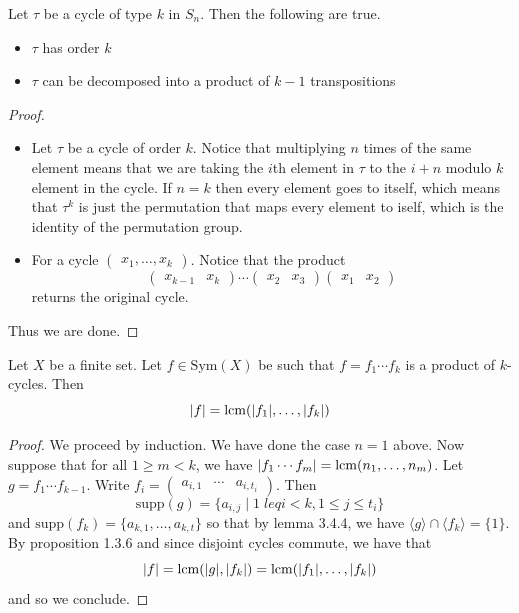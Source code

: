 \documentclass[a4paper]{article}
\begin{document}
\begin{prp}{}{} Let $\tau$ be a cycle of type $k$ in $S_n$. Then the following are true. 
\begin{itemize}
\item $\tau$ has order $k$
\item $\tau$ can be decomposed into a product of $k-1$ transpositions
\end{itemize}
\begin{proof}~\\
\begin{itemize}
\item Let $\tau$ be a cycle of order $k$. Notice that multiplying $n$ times of the same element means that we are taking the $i$th element in $\tau$ to the $i+n$ modulo $k$ element in the cycle. If $n=k$ then every element goes to itself, which means that $\tau^k$ is just the permutation that maps every element to iself, which is the identity of the permutation group. 
\item For a cycle $\begin{pmatrix}x_1,\dots,x_k\end{pmatrix}$. Notice that the product $$\begin{pmatrix}x_{k-1}&x_k\end{pmatrix}\cdots\begin{pmatrix}x_2&x_3\end{pmatrix}\begin{pmatrix}x_1&x_2\end{pmatrix}$$ returns the original cycle. 
\end{itemize}
Thus we are done. 
\end{proof}
\end{prp}

\begin{prp}{}{} Let $X$ be a finite set. Let $f\in\text{Sym}(X)$ be such that $f=f_1\cdots f_k$ is a product of $k$-cycles. Then $$\abs{f}=\operatorname{lcm}(\abs{f_1},\dots,\abs{f_k})$$ 
\begin{proof}
We proceed by induction. We have done the case $n=1$ above. Now suppose that for all $1\geq m<k$, we have $\abs{f_1\cdots f_m}=\operatorname{lcm}(n_1,\dots,n_m)$. Let $g=f_1\cdots f_{k-1}$. Write $f_i=\begin{pmatrix}a_{i,1}&\cdots&a_{i,t_i}\end{pmatrix}$. Then $$\text{supp}(g)=\{a_{i,j}\;|\;1\;leq i<k, 1\leq j\leq t_i\}$$ and $\text{supp}(f_k)=\{a_{k,1},\dots,a_{k,t}\}$ so that by lemma 3.4.4, we have $\langle g\rangle\cap\langle f_k\rangle=\{1\}$. By proposition 1.3.6 and since disjoint cycles commute, we have that $$\abs{f}=\operatorname{lcm}(\abs{g},\abs{f_k})=\operatorname{lcm}(\abs{f_1},\dots,\abs{f_k})$$ and so we conclude. 
\end{proof}
\end{prp}
\end{document}
